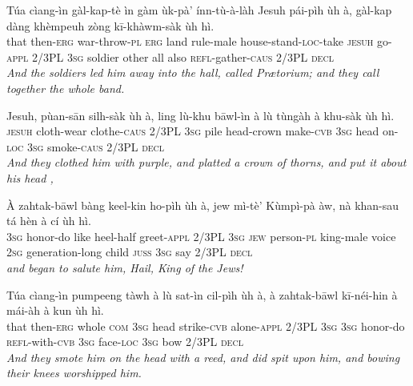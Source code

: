 \documentclass[11pt,a4paper]{article}
\begin{document}
\begin{exe}
\gll Túa cìang-ìn gàl-kap-tè ìn gàm ùk-pà' ínn-tù-à-làh Jesuh pái-pìh ùh à, gàl-kap dàng khèmpeuh zòng kī-khàwm-sàk ùh hì. \\
     that then-\textsc{erg} war-throw-\textsc{pl} \textsc{erg} land rule-male house-stand-\textsc{loc}-take \textsc{jesuh} go-\textsc{appl} 2/3PL \textsc{3sg} soldier other all also \textsc{refl}-gather-\textsc{caus} 2/3PL \textsc{decl} \\
\glt \textcolor{kjvcolor}{\textit{And the soldiers led him away into the hall, called Prætorium; and they call together the whole band.}}

\gll Jesuh, pùan-sān silh-sàk ùh à, ling lù-khu bāwl-ìn à lù tùngàh à khu-sàk ùh hì. \\
     \textsc{jesuh} cloth-wear clothe-\textsc{caus} 2/3PL \textsc{3sg} pile head-crown make-\textsc{cvb} \textsc{3sg} head on-\textsc{loc} \textsc{3sg} smoke-\textsc{caus} 2/3PL \textsc{decl} \\
\glt \textcolor{kjvcolor}{\textit{And they clothed him with purple, and platted a crown of thorns, and put it about his head ,}}

\gll À zahtak-bāwl bàng keel-kin ho-pìh ùh à, jew mì-tè' Kùmpì-pà àw, nà khan-sau tá hèn à cí ùh hì. \\
     \textsc{3sg} honor-do like heel-half greet-\textsc{appl} 2/3PL \textsc{3sg} \textsc{jew} person-\textsc{pl} king-male voice \textsc{2sg} generation-long child \textsc{juss} \textsc{3sg} say 2/3PL \textsc{decl} \\
\glt \textcolor{kjvcolor}{\textit{and began to salute him, Hail, King of the Jews!}}

\gll Túa cìang-ìn pumpeeng tàwh à lù sat-ìn cil-pìh ùh à, à zahtak-bāwl kī-néi-hin à mái-àh à kun ùh hì. \\
     that then-\textsc{erg} whole \textsc{com} \textsc{3sg} head strike-\textsc{cvb} alone-\textsc{appl} 2/3PL \textsc{3sg} \textsc{3sg} honor-do \textsc{refl}-with-\textsc{cvb} \textsc{3sg} face-\textsc{loc} \textsc{3sg} bow 2/3PL \textsc{decl} \\
\glt \textcolor{kjvcolor}{\textit{And they smote him on the head with a reed, and did spit upon him, and bowing their knees worshipped him.}}


\end{exe}
\end{document}
